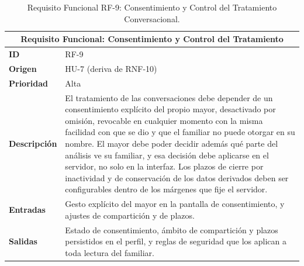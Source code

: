 \begin{table}[htbp]
    \centering
    \caption{Requisito Funcional RF-9: Consentimiento y Control del Tratamiento Conversacional.}
    \label{tab:rf9}
    \renewcommand{\arraystretch}{1.3}
    \begin{tabular}{|l|>{\raggedright\arraybackslash}p{}|}
        \hline
        \multicolumn{2}{|c|}{\textbf{Requisito Funcional: Consentimiento y Control del Tratamiento}} \\
        \hline
        \textbf{ID} & RF-9 \\
        \hline
        \textbf{Origen} & HU-7 (deriva de RNF-10) \\
        \hline
        \textbf{Prioridad} & Alta \\
        \hline
        \textbf{Descripción} & El tratamiento de las conversaciones debe depender de un consentimiento explícito del propio mayor, desactivado por omisión, revocable en cualquier momento con la misma facilidad con que se dio y que el familiar no puede otorgar en su nombre. El mayor debe poder decidir además qué parte del análisis ve su familiar, y esa decisión debe aplicarse en el servidor, no solo en la interfaz. Los plazos de cierre por inactividad y de conservación de los datos derivados deben ser configurables dentro de los márgenes que fije el servidor. \\
        \hline
        \textbf{Entradas} & Gesto explícito del mayor en la pantalla de consentimiento, y ajustes de compartición y de plazos. \\
        \hline
        \textbf{Salidas} & Estado de consentimiento, ámbito de compartición y plazos persistidos en el perfil, y reglas de seguridad que los aplican a toda lectura del familiar. \\
        \hline
    \end{tabular}

\end{table}

